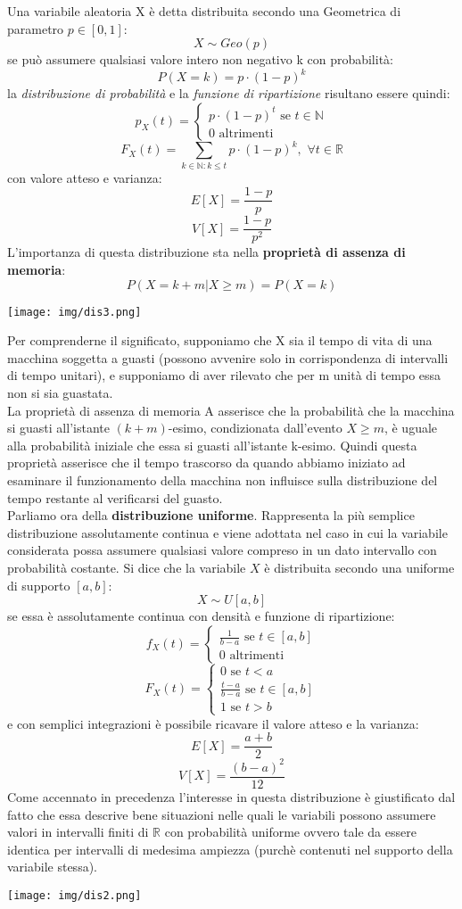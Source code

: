 \documentclass[a4paper,12pt, oneside]{book}
\newcommand{\numberset}{\mathbb}
\newcommand{\R}{\numberset{R}}
\begin{document}
Una variabile aleatoria X è detta distribuita secondo una Geometrica di parametro $p\in[0,1]$:
\[X\sim Geo(p)\]
se può assumere qualsiasi valore intero non negativo k con probabilità:
\[P(X=k)=p\cdot (1-p)^k\]
la \textit{distribuzione di probabilità} e la \textit{funzione di ripartizione} risultano essere quindi:
\[p_X(t)=\begin{cases}
p\cdot (1-p)^t \mbox{ se } t\in\mathbb{N}\\
0 \mbox{ altrimenti}
\end{cases}\]
\[F_X(t)=\sum_{k\in\mathbb{N}:k\leq t}p\cdot(1-p)^k,\,\,\forall t\in\R \]
con valore atteso e varianza:
\[E[X]=\frac{1-p}{p}\]
\[V[X]=\frac{1-p}{p^2}\]
L'importanza di questa distribuzione sta nella \textbf{proprietà di assenza di memoria}:
\[P(X=k+m|X\geq m)=P(X=k)\]
\begin{center}
	\texttt{[image: img/dis3.png]}
\end{center}
Per comprenderne il significato, supponiamo che X sia il tempo di vita di una macchina soggetta a guasti (possono avvenire solo in corrispondenza di intervalli di tempo unitari), e supponiamo di aver rilevato che per m unità di tempo essa non si sia guastata.\\
La proprietà di assenza di memoria A asserisce che la probabilità che la macchina si guasti all'istante $(k+m)$-esimo, condizionata dall'evento $X\geq m$, è uguale alla probabilità iniziale che essa si guasti all'istante k-esimo. Quindi questa proprietà asserisce che il tempo trascorso
da quando abbiamo iniziato ad esaminare il funzionamento della macchina non influisce sulla distribuzione del tempo restante al verificarsi del guasto.\\
Parliamo ora della \textbf{distribuzione uniforme}. Rappresenta la più semplice distribuzione assolutamente continua e viene adottata
nel caso in cui la variabile considerata possa assumere qualsiasi valore compreso in un dato intervallo con probabilità costante. Si dice che la variabile $X$ è distribuita secondo una uniforme di supporto $[a,b]$:
\[X\sim U[a,b]\]
se essa è assolutamente continua con densità e funzione di ripartizione:
\[f_X(t)=\begin{cases}
\frac{1}{b-a} \mbox{ se } t\in[a,b]\\
0 \mbox{ altrimenti}
\end{cases}\]
\[F_X(t)=\begin{cases}
0 \mbox{ se } t<a\\
\frac{t-a}{b-a} \mbox{ se } t\in[a,b]\\
1 \mbox{ se } t> b
\end{cases}\]
e con semplici integrazioni è possibile ricavare il valore atteso e la varianza:
\[E[X]=\frac{a+b}{2}\]
\[V[X]=\frac{(b-a)^2}{12}\]
Come accennato in precedenza l'interesse in questa distribuzione è giustificato dal
fatto che essa descrive bene situazioni nelle quali le variabili possono assumere valori in intervalli finiti di $\R$ con probabilità uniforme ovvero tale da essere identica per intervalli di medesima ampiezza (purchè contenuti nel supporto della variabile stessa).\\
\begin{center}
	\texttt{[image: img/dis2.png]}
\end{center}
\end{document}
